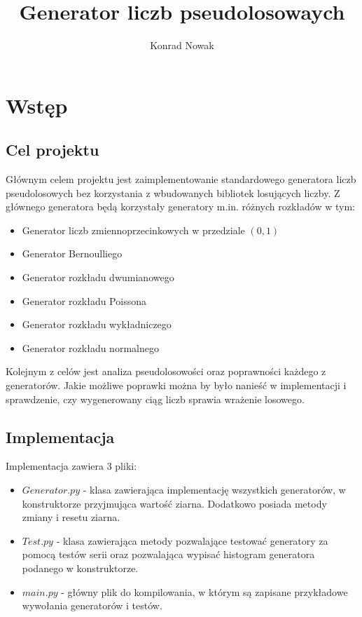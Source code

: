 \documentclass[60pt]{article}
\title{Generator liczb pseudolosowaych}
\author{Konrad Nowak}
\begin{document}
\maketitle

\newpage
\tableofcontents

\newpage

\section{Wstęp}
\subsection{Cel projektu}
Głównym celem projektu jest zaimplementowanie standardowego generatora liczb pseudolosowych bez korzystania z wbudowanych bibliotek losujących liczby. Z głównego generatora będą korzystały generatory m.in. różnych rozkładów w tym:
\begin{itemize}
    \item Generator liczb zmiennoprzecinkowych w przedziale $(0,1)$
    \item Generator Bernoulliego
    \item Generator rozkładu dwumianowego
    \item Generator rozkładu Poissona
    \item Generator rozkładu wykładniczego
    \item Generator rozkładu normalnego
\end{itemize}
Kolejnym z celów jest analiza pseudolosowości oraz poprawności każdego z generatorów. Jakie możliwe poprawki można by było nanieść w implementacji i sprawdzenie, czy wygenerowany ciąg liczb sprawia wrażenie losowego.

\subsection{Implementacja}
Implementacja zawiera 3 pliki:
\begin{itemize}
    \item $Generator.py$ - klasa zawierająca implementację wszystkich generatorów, w konstruktorze przyjmująca wartość ziarna. Dodatkowo posiada metody zmiany i resetu ziarna.
    \item $Test.py$ - klasa zawierająca metody pozwalające testować generatory za pomocą testów serii oraz pozwalająca wypisać histogram generatora podanego w konstruktorze.
    \item $main.py$ - główny plik do kompilowania, w którym są zapisane przykładowe wywołania generatorów i testów.
\end{itemize}
\end{document}
